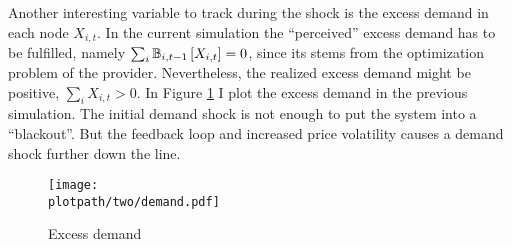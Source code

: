 Another interesting variable to track during the shock is the excess demand in each node $X_{i, t}$. In the current simulation the ``perceived'' excess demand has to be fulfilled, namely $\sum_i \mathbb{B}_{i, t-1}\left[X_{i, t}\right] = 0$, since its stems from the optimization problem of the provider. Nevertheless, the realized excess demand might be positive, $\sum_i X_{i, t} > 0$. In Figure \ref{fig:twodemand} I plot the excess demand in the previous simulation. The initial demand shock is not enough to put the system into a ``blackout''. But the feedback loop and increased price volatility causes a demand shock further down the line.

\begin{figure}[H]
  \centering
  \texttt{[image: \\plotpath/two/demand.pdf]}
  \caption{Excess demand} \label{fig:twodemand}
\end{figure}